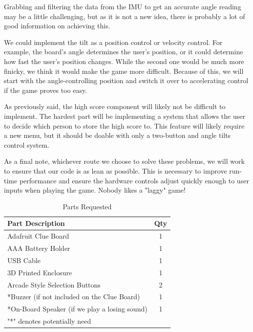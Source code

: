 \documentclass[12pt]{article}
\begin{document}
Grabbing and filtering the data from the IMU to get an accurate angle reading may be a little challenging, but as it is not a new idea, there is probably a lot of good information on achieving this. 

We could implement the tilt as a position control or velocity control. For example, the board's angle determines the user's position, or it could determine how fast the user's position changes. While the second one would be much more finicky, we think it would make the game more difficult. Because of this, we will start with the angle-controlling position and switch it over to accelerating control if the game proves too easy.

As previously said, the high score component will likely not be difficult to implement. The hardest part will be implementing a system that allows the user to decide which person to store the high score to. This feature will likely require a new menu, but it should be doable with only a two-button and angle tilts control system.

As a final note, whichever route we choose to solve these problems, we will work to ensure that our code is as lean as possible. This is necessary to improve run-time performance and ensure the hardware controls adjust quickly enough to user inputs when playing the game. Nobody likes a "laggy" game!
 

\begin{table}[ht]
  \caption{Parts Requested}
  \label{table:parts_list}
  \begin{center}
  \begin{tabular}{|p{3in}|c|}
  
  \hline
  Part Description & Qty\\
  \hline
  \hline
  Adafruit Clue Board & 1 \\
  \hline
  AAA Battery Holder & 1 \\
  \hline
  USB Cable & 1 \\
  \hline
  3D Printed Enclosure & 1 \\
  \hline
  Arcade Style Selection Buttons & 2\\
  \hline
  *Buzzer (if not included on the Clue Board) & 1\\
  \hline
  *On-Board Speaker (if we play a losing sound) & 1\\
  \hline
  "*" denotes potentially need &\\
  \hline
  \end{tabular}
  \end{center}
  \end{table}
\end{document}
